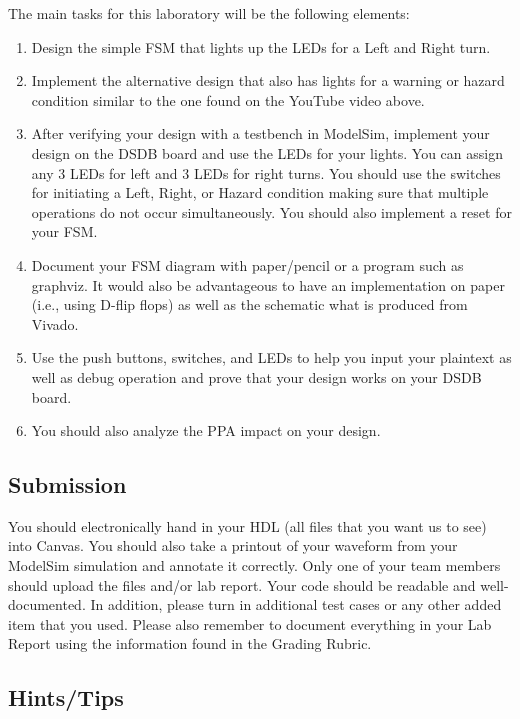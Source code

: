 \documentclass{article}
\begin{document}
The main tasks for this laboratory
will be the following elements:
\begin{enumerate}
  \item Design the simple FSM that lights up the LEDs for a Left and
    Right turn.
  \item Implement the alternative design that also has lights for a 
    warning or hazard condition similar to the one found on the YouTube
    video above.
  \item After verifying your design with a testbench in ModelSim,
    implement your design on the DSDB board and use the    
    LEDs for your lights.  You can assign any $3$ LEDs for left and
    $3$ LEDs for right turns.  You should use the switches for initiating a
    Left, Right, or Hazard condition making sure that multiple
    operations do not occur simultaneously.  You should also implement
    a reset for your FSM.
  \item Document your FSM diagram with paper/pencil or a program such
    as graphviz.  It would also be advantageous to have an
    implementation on paper (i.e., using D-flip flops)
    as well as the schematic what is produced from Vivado.
  \item Use the push buttons, switches, and LEDs to help you input
    your plaintext as well as debug operation and prove that your
    design works on your DSDB board.
    \item You should also analyze the PPA impact on your design. 
\end{enumerate}

\subsection{Submission}

You should electronically hand in your HDL (all files that you want
us to see) into Canvas.
You should also take a printout of your waveform 
from your ModelSim simulation and annotate it correctly.  
Only one of your team members should upload
the files and/or lab report. Your
code should be
readable and well-documented. In addition, please turn in additional
test cases or any other added item that you used. 
Please also remember to document everything in your Lab Report using
the information found in the Grading Rubric.


\subsection{Hints/Tips}
\end{document}
